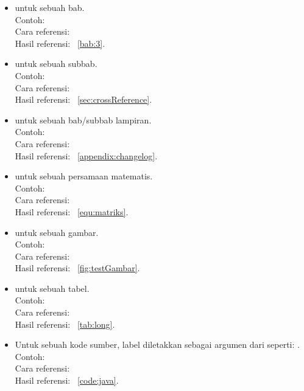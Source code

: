 \begin{itemize}
	\item {} untuk sebuah bab. \\
	Contoh:  \\
	Cara referensi:  \\
	Hasil referensi: \bab~\ref{bab:3}.
	\item {} untuk sebuah subbab. \\
	Contoh:  \\
	Cara referensi:  \\
	Hasil referensi: \sect~\ref{sec:crossReference}.
	\item {} untuk sebuah bab/subbab lampiran. \\
	Contoh:  \\
	Cara referensi:  \\	Hasil referensi: \apdx~\ref{appendix:changelog}.
	\item {} untuk sebuah persamaan matematis. \\
	Contoh:  \\
	Cara referensi:  \\
	Hasil referensi: \equ~\ref{equ:matriks}.
	\item {} untuk sebuah gambar. \\
	Contoh:  \\
	Cara referensi:  \\
	Hasil referensi: \pic~\ref{fig:testGambar}.
	\item {} untuk sebuah tabel. \\
	Contoh:  \\
	Cara referensi:  \\
	Hasil referensi: \tab~\ref{tab:long}.
	\item Untuk sebuah kode sumber, label diletakkan sebagai argumen dari  seperti: . \\
	Contoh:  \\
	Cara referensi:  \\
	Hasil referensi: \lst~\ref{code:java}.
\end{itemize}


